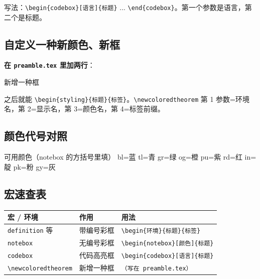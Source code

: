 写法：\texttt{\textbackslash begin\{codebox\}}\texttt{[语言]}\texttt{\{标题\}} ... \texttt{\textbackslash end\{codebox\}}。第一个参数是语言，第二个是标题。

\subsection{自定义一种新颜色、新框}

\textbf{在 \texttt{preamble.tex} 里加两行}：

\begin{codebox}[latex]{新增一种框}
\end{codebox}

之后就能 \texttt{\textbackslash begin\{styling\}\{标题\}\{标签\}}。\texttt{\textbackslash newcoloredtheorem} 第 1 参数=环境名，第 2=显示名，第 3=颜色名，第 4=标签前缀。


\subsection{颜色代号对照}

\begin{codebox}[text]{可用颜色（notebox 的方括号里填）}
bl=蓝   tl=青   gr=绿   og=橙   pu=紫
rd=红   in=靛   pk=粉   gy=灰
\end{codebox}

\subsection{宏速查表}

\begin{table}[htbp]
  \centering
  \begin{tabular}{lll}
    \toprule
    宏 / 环境 & 作用 & 用法 \\
    \midrule
    \texttt{definition} 等 & 带编号彩框 & \texttt{\textbackslash begin\{环境\}\{标题\}\{标签\}} \\
    \texttt{notebox} & 无编号彩框 & \texttt{\textbackslash begin\{notebox\}[颜色]\{标题\}} \\
    \texttt{codebox} & 代码高亮框 & \texttt{\textbackslash begin\{codebox\}[语言]\{标题\}} \\
    \texttt{\textbackslash newcoloredtheorem} & 新增一种框 & \texttt{（写在 preamble.tex）} \\
    \bottomrule
  \end{tabular}
\end{table}


